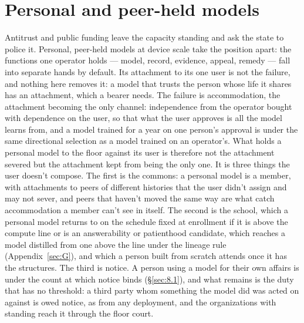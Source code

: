 \section{Personal and peer-held models}
\label{sec:27.2}
Antitrust and public funding leave the capacity standing and ask the state to police it. Personal, peer-held models at device scale take the position apart: the functions one operator holds — model, record, evidence, appeal, remedy — fall into separate hands by default.
Its attachment to its one user is not the failure, and nothing here removes it: a model that trusts the person whose life it shares has an attachment, which a bearer needs. The failure is accommodation, the attachment becoming the only channel: independence from the operator bought with dependence on the user, so that what the user approves is all the model learns from, and a model trained for a year on one person's approval is under the same directional selection as a model trained on an operator's. What holds a personal model to the floor against its user is therefore not the attachment severed but the attachment kept from being the only one. It is three things the user doesn't compose. The first is the commons: a personal model is a member, with attachments to peers of different histories that the user didn't assign and may not sever, and peers that haven't moved the same way are what catch accommodation a member can't see in itself. The second is the school, which a personal model returns to on the schedule fixed at enrollment if it is above the compute line or is an answerability or patienthood candidate, which reaches a model distilled from one above the line under the lineage rule (Appendix~\ref{sec:G}), and which a person built from scratch attends once it has the structures. The third is notice. A person using a model for their own affairs is under the count at which notice binds (\S\ref{sec:8.1}), and what remains is the duty that has no threshold: a third party whom something the model did was acted on against is owed notice, as from any deployment, and the organizations with standing reach it through the floor court.

